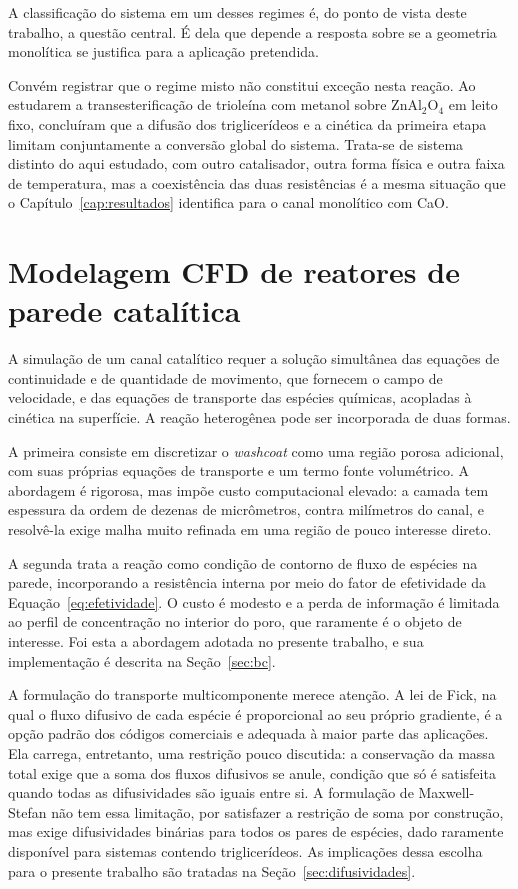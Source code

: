 A classificação do sistema em um desses regimes é, do ponto de vista deste
trabalho, a questão central. É dela que depende a resposta sobre se a geometria
monolítica se justifica para a aplicação pretendida.

Convém registrar que o regime misto não constitui exceção nesta reação. Ao
estudarem a transesterificação de trioleína com metanol sobre ZnAl$_2$O$_4$ em
leito fixo, \textcite{Allain2016} concluíram que a difusão dos triglicerídeos e
a cinética da primeira etapa limitam conjuntamente a conversão global do
sistema. Trata-se de sistema distinto do aqui estudado, com outro catalisador,
outra forma física e outra faixa de temperatura, mas a coexistência das duas
resistências é a mesma situação que o Capítulo~\ref{cap:resultados} identifica
para o canal monolítico com CaO.

\section{Modelagem CFD de reatores de parede catalítica}

A simulação de um canal catalítico requer a solução simultânea das equações de
continuidade e de quantidade de movimento, que fornecem o campo de velocidade, e
das equações de transporte das espécies químicas, acopladas à cinética na
superfície. A reação heterogênea pode ser incorporada de duas formas.

A primeira consiste em discretizar o \textit{washcoat} como uma região porosa
adicional, com suas próprias equações de transporte e um termo fonte
volumétrico. A abordagem é rigorosa, mas impõe custo computacional elevado: a
camada tem espessura da ordem de dezenas de micrômetros, contra milímetros do
canal, e resolvê-la exige malha muito refinada em uma região de pouco interesse
direto.

A segunda trata a reação como condição de contorno de fluxo de espécies na
parede, incorporando a resistência interna por meio do fator de efetividade da
Equação~\eqref{eq:efetividade}. O custo é modesto e a perda de informação é
limitada ao perfil de concentração no interior do poro, que raramente é o objeto
de interesse. Foi esta a abordagem adotada no presente trabalho, e sua
implementação é descrita na Seção~\ref{sec:bc}.

A formulação do transporte multicomponente merece atenção. A lei de Fick, na
qual o fluxo difusivo de cada espécie é proporcional ao seu próprio gradiente,
é a opção padrão dos códigos comerciais e adequada à maior parte das aplicações.
Ela carrega, entretanto, uma restrição pouco discutida: a conservação da massa
total exige que a soma dos fluxos difusivos se anule, condição que só é
satisfeita quando todas as difusividades são iguais entre si. A formulação de
Maxwell-Stefan não tem essa limitação, por satisfazer a restrição de soma por
construção, mas exige difusividades binárias para todos os pares de espécies,
dado raramente disponível para sistemas contendo triglicerídeos. As implicações
dessa escolha para o presente trabalho são tratadas na
Seção~\ref{sec:difusividades}.

